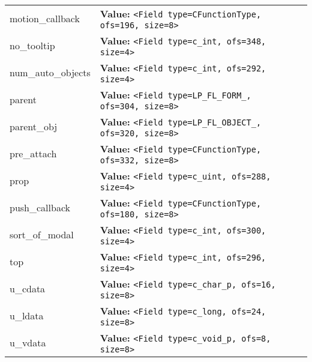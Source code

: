 \begin{longtable}{|p{\varnamewidth}|p{\vardescrwidth}|l}
\cline{1-2}
\raggedright m\-o\-t\-i\-o\-n\-\_\-c\-a\-l\-l\-b\-a\-c\-k\- & \raggedright \textbf{Value:} 
{\tt {\textless}Field type=CFunctionType, ofs=196, size=8{\textgreater}}&\\
\cline{1-2}
\raggedright n\-o\-\_\-t\-o\-o\-l\-t\-i\-p\- & \raggedright \textbf{Value:} 
{\tt {\textless}Field type=c\_int, ofs=348, size=4{\textgreater}}&\\
\cline{1-2}
\raggedright n\-u\-m\-\_\-a\-u\-t\-o\-\_\-o\-b\-j\-e\-c\-t\-s\- & \raggedright \textbf{Value:} 
{\tt {\textless}Field type=c\_int, ofs=292, size=4{\textgreater}}&\\
\cline{1-2}
\raggedright p\-a\-r\-e\-n\-t\- & \raggedright \textbf{Value:} 
{\tt {\textless}Field type=LP\_FL\_FORM\_, ofs=304, size=8{\textgreater}}&\\
\cline{1-2}
\raggedright p\-a\-r\-e\-n\-t\-\_\-o\-b\-j\- & \raggedright \textbf{Value:} 
{\tt {\textless}Field type=LP\_FL\_OBJECT\_, ofs=320, size=8{\textgreater}}&\\
\cline{1-2}
\raggedright p\-r\-e\-\_\-a\-t\-t\-a\-c\-h\- & \raggedright \textbf{Value:} 
{\tt {\textless}Field type=CFunctionType, ofs=332, size=8{\textgreater}}&\\
\cline{1-2}
\raggedright p\-r\-o\-p\- & \raggedright \textbf{Value:} 
{\tt {\textless}Field type=c\_uint, ofs=288, size=4{\textgreater}}&\\
\cline{1-2}
\raggedright p\-u\-s\-h\-\_\-c\-a\-l\-l\-b\-a\-c\-k\- & \raggedright \textbf{Value:} 
{\tt {\textless}Field type=CFunctionType, ofs=180, size=8{\textgreater}}&\\
\cline{1-2}
\raggedright s\-o\-r\-t\-\_\-o\-f\-\_\-m\-o\-d\-a\-l\- & \raggedright \textbf{Value:} 
{\tt {\textless}Field type=c\_int, ofs=300, size=4{\textgreater}}&\\
\cline{1-2}
\raggedright t\-o\-p\- & \raggedright \textbf{Value:} 
{\tt {\textless}Field type=c\_int, ofs=296, size=4{\textgreater}}&\\
\cline{1-2}
\raggedright u\-\_\-c\-d\-a\-t\-a\- & \raggedright \textbf{Value:} 
{\tt {\textless}Field type=c\_char\_p, ofs=16, size=8{\textgreater}}&\\
\cline{1-2}
\raggedright u\-\_\-l\-d\-a\-t\-a\- & \raggedright \textbf{Value:} 
{\tt {\textless}Field type=c\_long, ofs=24, size=8{\textgreater}}&\\
\cline{1-2}
\raggedright u\-\_\-v\-d\-a\-t\-a\- & \raggedright \textbf{Value:} 
{\tt {\textless}Field type=c\_void\_p, ofs=8, size=8{\textgreater}}&\\
\cline{1-2}

\end{longtable}
